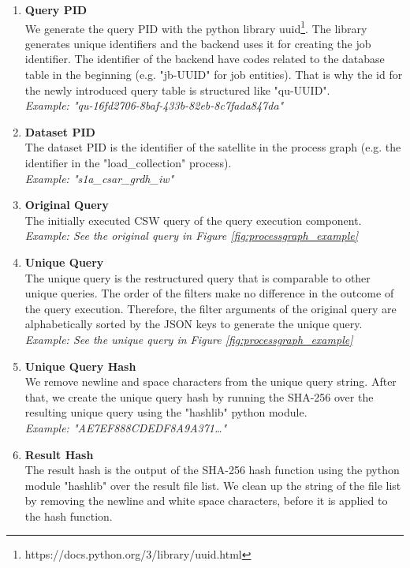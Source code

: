 \documentclass[draft,final]{vutinfth} %
\begin{document}
\begin{enumerate}
	\item \textbf{Query PID} \\
	We generate the query PID with the python library uuid\footnote{https://docs.python.org/3/library/uuid.html}. The library generates unique identifiers and the backend uses it for creating the job identifier. The identifier of the backend have codes related to the database table in the beginning (e.g. "jb-UUID" for job entities). That is why the id for the newly introduced query table is structured like "qu-UUID". \\
	\textit{Example: "qu-16fd2706-8baf-433b-82eb-8c7fada847da"}
	\item \textbf{Dataset PID} \\ 
	The dataset PID is the identifier of the satellite in the process graph (e.g. the identifier in the "load\_collection" process). \\
	\textit{Example: "s1a\_csar\_grdh\_iw"}	    	
	\item\textbf{Original Query} \\
	The initially executed CSW query of the query execution component.  \\ 
	\textit{Example: See the original query in Figure \ref{fig:processgraph_example}}	 
	\item \textbf{Unique Query} \\
	The unique query is the restructured query that is comparable to other unique queries. The order of the filters make no difference in the outcome of the query execution. Therefore, the filter arguments of the original query are alphabetically sorted by the JSON keys to generate the unique query. \\
	\textit{Example: See the unique query in Figure \ref{fig:processgraph_example}}	  	 	
	\item \textbf{Unique Query Hash} \\ 
	We remove newline and space characters from the unique query string. After that, we create the unique query hash by running the SHA-256 over the resulting unique query using the "hashlib" python module.  \\
	\textit{Example: "AE7EF888CDEDF8A9A371\dots"} 
	\item \textbf{Result Hash} \\
	The result hash is the output of the SHA-256 hash function using the python module "hashlib" over the result file list. We clean up the string of the file list by removing the newline and white space characters, before it is applied to the hash function. \\

\end{enumerate}
\end{document}

